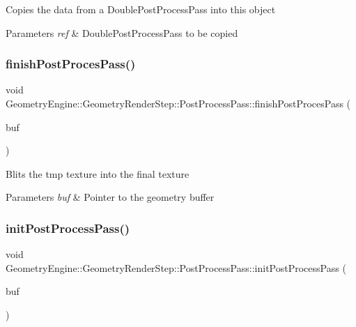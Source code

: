 Copies the data from a Double\+Post\+Process\+Pass into this object 
\begin{DoxyParams}{Parameters}
{\em ref} & Double\+Post\+Process\+Pass to be copied \\
\hline
\end{DoxyParams}
\mbox{\label{class_geometry_engine_1_1_geometry_render_step_1_1_post_process_pass_abfc2e269aad1157916f6c3c72b570ae9}} 
\subsubsection{\texorpdfstring{finishPostProcesPass()}{finishPostProcesPass()}}
{\footnotesize\ttfamily void Geometry\+Engine\+::\+Geometry\+Render\+Step\+::\+Post\+Process\+Pass\+::finish\+Post\+Proces\+Pass (\begin{DoxyParamCaption}\item[{\mbox{\hyperlink{class_geometry_engine_1_1_geometry_buffer_1_1_g_buffer}{Geometry\+Buffer\+::\+G\+Buffer}} $\ast$}]{buf }\end{DoxyParamCaption})\hspace{0.3cm}{\ttfamily [protected]}}

Blits the tmp texture into the final texture 
\begin{DoxyParams}{Parameters}
{\em buf} & Pointer to the geometry buffer \\
\hline
\end{DoxyParams}
\mbox{\label{class_geometry_engine_1_1_geometry_render_step_1_1_post_process_pass_ae0bfafe4123decb5eb65e1decc3c07ba}} 
\subsubsection{\texorpdfstring{initPostProcessPass()}{initPostProcessPass()}}
{\footnotesize\ttfamily void Geometry\+Engine\+::\+Geometry\+Render\+Step\+::\+Post\+Process\+Pass\+::init\+Post\+Process\+Pass (\begin{DoxyParamCaption}\item[{\mbox{\hyperlink{class_geometry_engine_1_1_geometry_buffer_1_1_g_buffer}{Geometry\+Buffer\+::\+G\+Buffer}} $\ast$}]{buf }\end{DoxyParamCaption})\hspace{0.3cm}{\ttfamily [protected]}}

